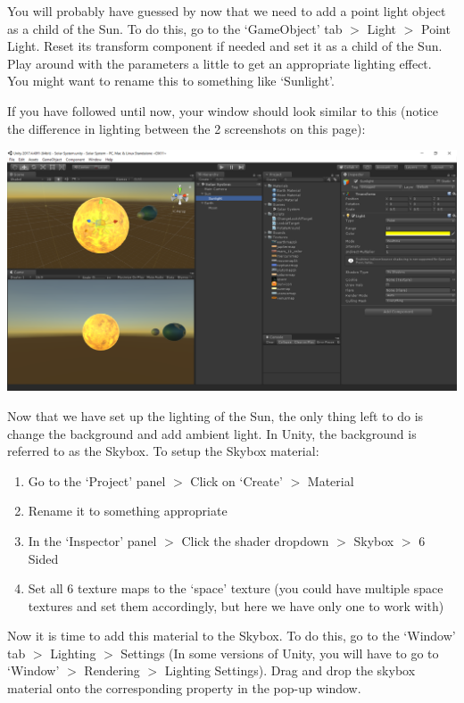 \documentclass{article}[a4paper,12pt]
\theoremstyle{definition}
\begin{document}
You will probably have guessed by now that we need to add a point light object as a child of the Sun. To do this, go to the `GameObject' tab $>$ Light $>$ Point Light. Reset its transform component if needed and set it as a child of the Sun. Play around with the parameters a little to get an appropriate lighting effect. You might want to rename this to something like `Sunlight'. 
\vspace{6pt}

If you have followed until now, your window should look similar to this (notice the difference in lighting between the 2 screenshots on this page):
\begin{center}\includegraphics[width=\textwidth]{add_sunlight.png}\end{center}
Now that we have set up the lighting of the Sun, the only thing left to do is change the background and add ambient light. In Unity, the background is referred to as the Skybox. To setup the Skybox material:
\begin{enumerate}
	\item Go to the `Project' panel $>$ Click on `Create' $>$ Material
	\item Rename it to something appropriate
	\item In the `Inspector' panel $>$ Click the shader dropdown $>$ Skybox $>$ 6 Sided
	\item Set all 6 texture maps to the `space' texture (you could have multiple space textures and set them accordingly, but here we have only one to work with)
\end{enumerate}
Now it is time to add this material to the Skybox. To do this, go to the `Window' tab $>$ Lighting $>$ Settings (In some versions of Unity, you will have to go to `Window' $>$ Rendering $>$ Lighting Settings). Drag and drop the skybox material onto the corresponding property in the pop-up window.
\vspace{6pt}
\end{document}
